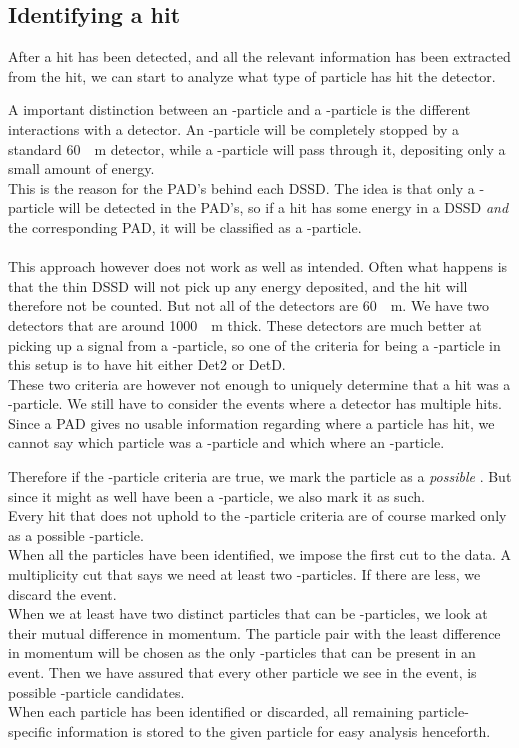 \subsection{Identifying a hit}
After a hit has been detected, and all the relevant information has been extracted from the hit, we can start to analyze what type of particle has hit the detector. 

A important distinction between an \al-particle and a \be-particle is the different interactions with a detector. An \al-particle will be completely stopped by a standard \SI{60}{\mu m} detector, while a \be-particle will pass through it, depositing only a small amount of energy. \\
This is the reason for the PAD's behind each DSSD. The idea is that only a \be-particle will be detected in the PAD's, so if a hit has some energy in a DSSD \textit{and} the corresponding PAD, it will be classified as a \be-particle.\\
\\
This approach however does not work as well as intended. Often what happens is that the thin DSSD will not pick up any energy deposited, and the hit will therefore not be counted. 
But not all of the detectors are \SI{60}{\mu m}. We have two detectors that are around \SI{1000}{\mu m} thick. These detectors are much better at picking up a signal from a \be-particle, so one of the criteria for being a \be-particle in this setup is to have hit either Det2 or DetD.\\

These two criteria are however not enough to uniquely determine that a hit was a \be-particle. We still have to consider the events where a detector has multiple hits. Since a PAD gives no usable information regarding where a particle has hit, we cannot say which particle was a \be-particle and which where an \al-particle. 

Therefore if the \be-particle criteria are true, we mark the particle as a \textit{possible} \be. But since it might as well have been a \al-particle, we also mark it as such.\\
Every hit that does not uphold to the \be-particle criteria are of course marked only as a possible \al-particle.
\\
%
When all the particles have been identified, we impose the first cut to the data. A multiplicity cut that says we need at least two \al-particles. If there are less, we discard the event. 
\\
When we at least have two distinct particles that can be \al-particles, we look at their mutual difference in momentum. The particle pair with the least difference in momentum will be chosen as the only \al-particles that can be present in an event. Then we have assured that every other particle we see in the event, is possible \be-particle candidates. 
\\
When each particle has been identified or discarded, all remaining particle-specific information is stored to the given particle for easy analysis henceforth.

